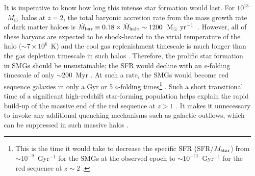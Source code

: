 \documentclass[iop,revtex4,twocolumn,apj,numberedappendix,appendixfloats]{emulateapj}
\newcommand{\ms}{$M_{\rm star}$}
\newcommand{\mg}{$M_{\rm gas}$}
\newcommand{\msun}{$M_{\odot}$}
\newcommand{\msunyr}{${\rm M}_{\odot}~{\rm yr}^{-1}$}
\begin{document}
It is imperative to know how long this intense star formation would last. For $10^{13}$~\msun\ halos at $z = 2$, the total baryonic accretion rate from the mass growth rate of dark matter haloes is $\dot{M}_{\rm bar} \equiv 0.18 \times \dot{M}_{\rm halo} \sim 1200$~\msunyr\ \citep{Neistein08}. However, all of these
baryons are expected to be shock-heated to the virial temperature of the halo ($\sim7\times10^6$~K) and the cool gas replenishment timescale is much longer than the gas depletion timescale in such halos \citep[e.g.,][]{Dekel06,Tacchella15}. Therefore, the prolific star formation in SMGs should be unsustainable; the SFR would decline with an $e$-folding timescale of only $\sim$200~Myr \citep[2\mg/SFR; e.g.,][]{Tacconi08,Bothwell12}. At such a rate, the SMGs would become red sequence galaxies in only a Gyr or 5 $e$-folding times\footnote{This is the time it would take to decrease the specific SFR (SFR/\ms) from $\sim$$10^{-9}$~Gyr$^{-1}$ for the SMGs at the observed epoch to $\sim$$10^{-11}$~Gyr$^{-1}$ for the red sequence at $z \sim 2$ \citep{Brammer09}.} \citep{Fu13}. Such a short transitional time of a significant high-redshift star-forming population
helps explain the rapid build-up of the massive end of the red sequence at $z > 1$ \citep[e.g.,][]{Ilbert13}. It makes it unnecessary to invoke any additional quenching mechanisms such as galactic outflows, which can be suppressed in such massive halos \citep[e.g.,][]{Singh16}. 
\end{document}
